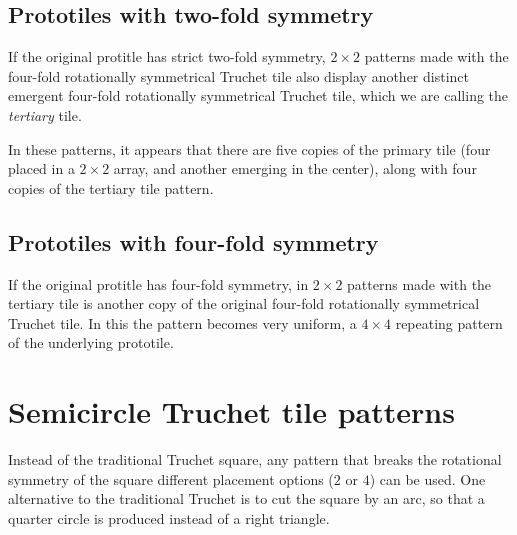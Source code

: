 \documentclass{tufte-book}
\begin{document}
\section{Prototiles with two-fold symmetry}

If the original protitle has strict two-fold symmetry,  $2\times 2$ patterns made with the four-fold rotationally symmetrical Truchet tile also display another distinct emergent four-fold rotationally symmetrical Truchet tile, which we are calling the \textit{tertiary} tile. 

\noindent
In these patterns, it appears that there are five copies of the primary tile (four placed in a $2\times 2$ array, and another emerging in the center), along with four copies of the tertiary tile pattern.

{
\setlength{\tabcolsep}{0pt}
\renewcommand{\arraystretch}{0}

}
\section{Prototiles with four-fold symmetry}

\noindent
If the original protitle has four-fold symmetry, in $2\times 2$ patterns made with the tertiary tile is another copy of the original four-fold rotationally symmetrical Truchet tile. In this the pattern becomes very uniform, a $4\times4$ repeating pattern of the underlying prototile.

{
\setlength{\tabcolsep}{0pt}
\renewcommand{\arraystretch}{0}

}
\chapter{Semicircle Truchet tile patterns}

\noindent
Instead of the traditional Truchet square, any pattern that breaks the rotational symmetry of the square different placement options ($2$ or $4$) can be used. One alternative to the traditional Truchet is to cut the square by an arc, so that a quarter circle is produced instead of a right triangle. 

\,
\vspace{0.2cm}

{
\setlength{\tabcolsep}{3pt}
\renewcommand{\arraystretch}{2}

}

\,
\vspace{0.2cm}
{
\setlength{\tabcolsep}{0pt}
\renewcommand{\arraystretch}{0}

}
\end{document}
